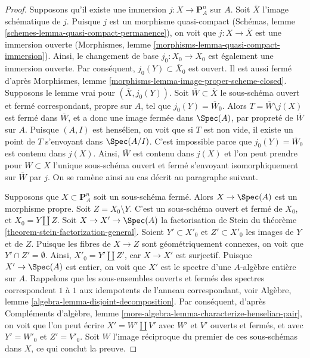 \begin{proof}
\medskip\noindent
Supposons qu'il existe une immersion $j : X \to \mathbf{P}^n_A$ sur $A$.
Soit $\overline{X}$ l'image schématique de $j$.
Puisque $j$ est un morphisme quasi-compact
(Schémas, lemme \ref{schemes-lemma-quasi-compact-permanence}),
on voit que $j : X \to \overline{X}$ est une immersion ouverte
(Morphismes, lemme \ref{morphisms-lemma-quasi-compact-immersion}).
Ainsi, le changement de base $j_0 : X_0 \to \overline{X}_0$
est également une immersion ouverte.
Par conséquent, $j_0(Y) \subset \overline{X}_0$ est ouvert.
Il est aussi fermé d'après Morphismes, lemme
\ref{morphisms-lemma-image-proper-scheme-closed}.
Supposons le lemme vrai pour $(\overline{X}, j_0(Y))$.
Soit $\overline{W} \subset \overline{X}$ le
sous-schéma ouvert et fermé correspondant, propre sur $A$,
tel que $j_0(Y) = \overline{W}_0$.
Alors $T = \overline{W} \setminus j(X)$ est fermé dans $\overline{W}$,
et a donc une image fermée dans $\Spec(A)$, par propreté de $\overline{W}$
sur $A$. Puisque $(A, I)$ est hensélien, on voit que si $T$
est non vide, il existe un point de $T$ s'envoyant dans $\Spec(A/I)$.
C'est impossible parce que $j_0(Y) = \overline{W}_0$ est contenu dans $j(X)$.
Ainsi, $\overline{W}$ est contenu dans $j(X)$ et l'on peut
prendre pour $W \subset X$ l'unique sous-schéma ouvert et fermé
s'envoyant isomorphiquement sur $\overline{W}$ par $j$.
On se ramène ainsi au cas décrit au paragraphe suivant.

\medskip\noindent
Supposons que $X \subset \mathbf{P}^n_A$ soit un sous-schéma fermé.
Alors $X \to \Spec(A)$ est un morphisme propre.
Soit $Z = X_0 \setminus Y$. C'est un sous-schéma ouvert et fermé
de $X_0$, et $X_0 = Y \amalg Z$.
Soit $X \to X' \to \Spec(A)$ la factorisation de Stein du
théorème \ref{theorem-stein-factorization-general}.
Soient $Y' \subset X'_0$ et $Z' \subset X'_0$ les images de
$Y$ et de $Z$.
Puisque les fibres de $X \to Z$ sont géométriquement connexes,
on voit que $Y' \cap Z' = \emptyset$.
Ainsi, $X'_0 = Y' \amalg Z'$, car $X \to X'$ est surjectif.
Puisque $X' \to \Spec(A)$ est entier, on voit que
$X'$ est le spectre d'une $A$-algèbre entière sur $A$.
Rappelons que les sous-ensembles ouverts et fermés des spectres correspondent
$1$ à $1$ aux idempotents de l'anneau correspondant, voir
Algèbre, lemme \ref{algebra-lemma-disjoint-decomposition}.
Par conséquent, d'après
Compléments d'algèbre, lemme \ref{more-algebra-lemma-characterize-henselian-pair},
on voit que l'on peut écrire $X' = W' \amalg V'$
avec $W'$ et $V'$ ouverts et fermés, et
avec $Y' = W'_0$ et $Z' = V'_0$.
Soit $W$ l'image réciproque du premier de ces sous-schémas dans $X$,
ce qui conclut la preuve.
\end{proof}









